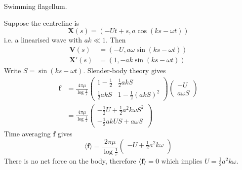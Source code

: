 \documentclass{jknotes}
\newcommand{\x}{\bm{x}}
\newcommand{\X}{\bm{X}}
\begin{document}
\begin{eg}
	Swimming flagellum. 
	
	\begin{center}
	\end{center}
			
	Suppose the centreline is
	\begin{equation}
		\bm{X}(s) = (-Ut+s, a\cos(ks-\omega t))
	\end{equation}
	i.e. a linearised wave with $a k \ll 1$. Then
	\begin{align}
		\bm{V}(s) &= (-U, a\omega\sin(ks-\omega t)) \\
		\X'(s) &= (1, -ak\sin(ks-\omega t))
	\end{align}
	Write $S = \sin(ks-\omega t)$. Slender-body theory gives
	\begin{align}
		\bm{f} &= \frac{4\pi\mu}{\log \frac{1}{\varepsilon}} \begin{pmatrix} 1-
			\frac{1}{2} & \frac{1}{2}akS \\ \frac{1}{2} akS & 1-
		\frac{1}{2}(akS)^2 \end{pmatrix} \begin{pmatrix} -U \\ a\omega S
		\end{pmatrix} \\
		&= \frac{4\pi \mu}{\log \frac{1}{\varepsilon}}\begin{pmatrix}
		-\frac{1}{2}U + \frac{1}{2}a^2k\omega S^2 \\ -\frac{1}{2}akUS + a\omega S
	\end{pmatrix}
	\end{align}
	Time averaging $\bm{f}$ gives
	\begin{equation}
		\langle \bm{f}\rangle = \frac{2\pi\mu}{\log \frac{1}{\varepsilon}}
	\begin{pmatrix} -U + \frac{1}{2}a^2k\omega \\ \end{pmatrix}
	\end{equation}
	There is no net force on the body, therefore $\langle \bm{f}\rangle = 0$
	which implies $U = \frac{1}{2}a^2k\omega$.
\end{eg}
\end{document}
